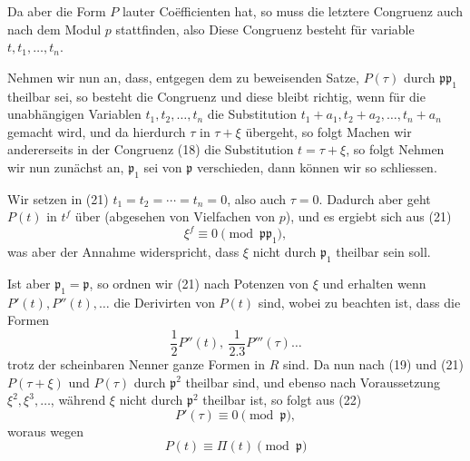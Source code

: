 Da aber die Form $P$ lauter  Coëfficienten hat, so muss die letztere Congruenz auch nach dem Modul $p$ stattfinden, also
Diese Congruenz besteht für variable $t, t_1, \ldots, t_n$.

Nehmen wir nun an, dass, entgegen dem zu beweisenden Satze, $P(\tau)$ durch $\mathfrak p \mathfrak p_1$ theilbar sei, so besteht die Congruenz
und diese bleibt richtig, wenn für die unabhängigen Variablen $t_1, t_2, \ldots, t_n$ die Substitution $t_1+a_1, t_2+a_2, \ldots, t_n+a_n$ gemacht wird, und da hierdurch $\tau$ in $\tau+\xi$ übergeht, so folgt
Machen wir andererseits in der Congruenz (18) die Substitution $t=\tau+\xi$, so folgt
Nehmen wir nun zunächst an, $\mathfrak p_1$ sei von $\mathfrak p$ verschieden, dann können wir so schliessen.

Wir setzen in (21) $t_1=t_2=\cdots=t_n=0$, also auch $\tau=0$. Dadurch aber geht $P(t)$ in $t^f$ über (abgesehen von Vielfachen von $p$), und es ergiebt sich aus (21)
\[ \xi^f \equiv 0 \pmod{\mathfrak p \mathfrak p_1}, \]
was aber der Annahme widerspricht, dass $\xi$ nicht durch $\mathfrak p_1$ theilbar sein soll.

Ist aber $\mathfrak p_1 = \mathfrak p$, so ordnen wir (21) nach Potenzen von $\xi$ und erhalten
wenn $P'(t), P''(t), \ldots$ die Derivirten von $P(t)$ sind, wobei zu beachten ist, dass die Formen
\[ \frac{1}{2} P''(t), \ \frac{1}{2.3} P'''(\tau) \ldots \]
trotz der scheinbaren Nenner ganze Formen in $R$ sind. Da nun nach (19) und (21) $P(\tau+\xi)$ und $P(\tau)$ durch $\mathfrak p^2$ theilbar sind, und ebenso nach Voraussetzung $\xi^2, \xi^3, \ldots$, während $\xi$ nicht durch $\mathfrak p^2$ theilbar ist, so folgt aus (22)
\[ P'(\tau) \equiv 0 \pmod{\mathfrak p}, \]
woraus wegen
\[ P(t) \equiv \Pi(t) \pmod{\mathfrak p} \]
